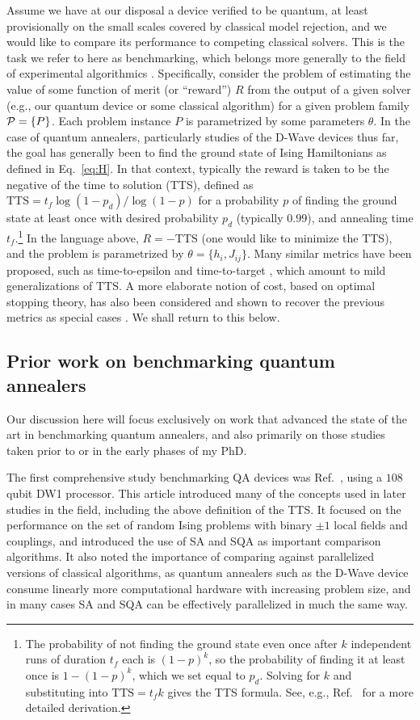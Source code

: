 Assume we have at our disposal a device verified to be quantum, at least provisionally on the small scales covered by classical model rejection, and we would like to compare its performance to competing classical solvers. This is the task we refer to here as benchmarking, which belongs more generally to the field of experimental algorithmics \cite{McGeoch:book}. Specifically, consider the problem of estimating the value of some function of merit (or ``reward'') $R$ from the output of a given solver (e.g., our quantum device or some classical algorithm) for a given problem family $\mathcal{P} = \{P\}$. Each problem instance $P$ is parametrized by some parameters $\theta$. In the case of quantum annealers, particularly studies of the D-Wave devices thus far, the goal has generally been to find the ground state of Ising Hamiltonians as defined in Eq.~\eqref{eq:H}. In that context, typically the reward is taken to be the negative of the time to solution (TTS), defined as $\text{TTS}=t_f \log(1-p_d)/\log(1-p)$ for a probability $p$ of finding the ground state at least once with desired probability $p_d$ (typically $0.99$), and annealing time $t_f$.\footnote{The probability of not finding the ground state even once after $k$ independent runs of duration $t_f$ each is $(1-p)^k$, so the probability of finding it at least once is $1-(1-p)^k$, which we set equal to $p_d$. Solving for $k$ and substituting into $\text{TTS}=t_f k$ gives the TTS formula. See, e.g., Ref.~\cite{speedup} for a more detailed derivation.} In the language above, $R=-\text{TTS}$ (one would like to minimize the TTS), and the problem is parametrized by $\theta=\{h_i,J_{ij}\}$. Many similar metrics have been proposed, such as time-to-epsilon and time-to-target \cite{King:2015cs}, which amount to mild generalizations of TTS. A more elaborate notion of cost, based on optimal stopping theory, has also been considered and shown to recover the previous metrics as special cases \cite{Vinci:2016tg}. We shall return to this below.

\subsection{Prior work on benchmarking quantum annealers}

Our discussion here will focus exclusively on work that advanced the state of the art in benchmarking quantum annealers, and also primarily on those studies taken prior to or in the early phases of my PhD.

The first comprehensive study benchmarking QA devices was Ref.~\cite{q108}, using a $108$ qubit DW1 processor. This article introduced many of the concepts used in later studies in the field, including the above definition of the TTS. It focused on the performance on the set of random Ising problems with binary $\pm1$ local fields and couplings, and introduced the use of SA and SQA as important comparison algorithms. It also noted the importance of comparing against parallelized versions of classical algorithms, as quantum annealers such as the D-Wave device consume linearly more computational hardware with increasing problem size, and in many cases SA and SQA can be effectively parallelized in much the same way.


